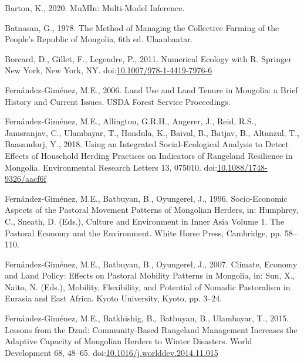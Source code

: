\documentclass[]{elsarticle} %
\newlength{\cslhangindent}
\newenvironment{cslreferences}%
  {\setlength{\parindent}{0pt}%
  \everypar{\setlength{\hangindent}{\cslhangindent}}\ignorespaces}%
  {\par}
\begin{document}
\hypertarget{refs}{}
\begin{cslreferences}
\leavevmode\hypertarget{ref-Barton.2020}{}%
Barton, K., 2020. MuMIn: Multi-Model Inference.

\leavevmode\hypertarget{ref-Batnasan.1978}{}%
Batnasan, G., 1978. The Method of Managing the Collective Farming of the
People's Republic of Mongolia, 6th ed. Ulaanbaatar.

\leavevmode\hypertarget{ref-Borcard.2011}{}%
Borcard, D., Gillet, F., Legendre, P., 2011. Numerical Ecology with R.
Springer New York, New York, NY.
doi:\href{https://doi.org/10.1007/978-1-4419-7976-6}{10.1007/978-1-4419-7976-6}

\leavevmode\hypertarget{ref-FernandezGimenez.2006}{}%
Fernández-Giménez, M.E., 2006. Land Use and Land Tenure in Mongolia: a
Brief History and Current Issues. USDA Forest Service Proceedings.

\leavevmode\hypertarget{ref-FernandezGimenez.2018}{}%
Fernández-Giménez, M.E., Allington, G.R.H., Angerer, J., Reid, R.S.,
Jamsranjav, C., Ulambayar, T., Hondula, K., Baival, B., Batjav, B.,
Altanzul, T., Baasandorj, Y., 2018. Using an Integrated
Social-Ecological Analysis to Detect Effects of Household Herding
Practices on Indicators of Rangeland Resilience in Mongolia.
Environmental Research Letters 13, 075010.
doi:\href{https://doi.org/10.1088/1748-9326/aacf6f}{10.1088/1748-9326/aacf6f}

\leavevmode\hypertarget{ref-FernandezGimenez.1996}{}%
Fernández-Giménez, M.E., Batbuyan, B., Oyungerel, J., 1996.
Socio-Economic Aspects of the Pastoral Movement Patterns of Mongolian
Herders, in: Humphrey, C., Sneath, D. (Eds.), Culture and Environment in
Inner Asia Volume 1. The Pastoral Economy and the Environment. White
Horse Press, Cambridge, pp. 58--110.

\leavevmode\hypertarget{ref-FernandezGimenez.2007}{}%
Fernández-Giménez, M.E., Batbuyan, B., Oyungerel, J., 2007. Climate,
Economy and Land Policy: Effects on Pastoral Mobility Patterns in
Mongolia, in: Sun, X., Naito, N. (Eds.), Mobility, Flexibility, and
Potential of Nomadic Pastoralism in Eurasia and East Africa. Kyoto
University, Kyoto, pp. 3--24.

\leavevmode\hypertarget{ref-FernandezGimenez.2015}{}%
Fernández-Giménez, M.E., Batkhishig, B., Batbuyan, B., Ulambayar, T.,
2015. Lessons from the Dzud: Community-Based Rangeland Management
Increases the Adaptive Capacity of Mongolian Herders to Winter
Disasters. World Development 68, 48--65.
doi:\href{https://doi.org/10.1016/j.worlddev.2014.11.015}{10.1016/j.worlddev.2014.11.015}


\end{cslreferences}
\end{document}
